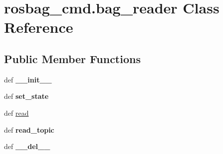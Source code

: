 \hypertarget{classrosbag__cmd_1_1bag__reader}{\section{rosbag\-\_\-cmd.\-bag\-\_\-reader Class Reference}
\label{classrosbag__cmd_1_1bag__reader}
}
\subsection*{Public Member Functions}
\begin{DoxyCompactItemize}
\item 
\hypertarget{classrosbag__cmd_1_1bag__reader_a1c340cf925f8d088902078782895c847}{def {\bfseries \-\_\-\-\_\-init\-\_\-\-\_\-}}\label{classrosbag__cmd_1_1bag__reader_a1c340cf925f8d088902078782895c847}

\item 
\hypertarget{classrosbag__cmd_1_1bag__reader_a292a0b9170ae69b7faca88b8d8ab6a84}{def {\bfseries set\-\_\-state}}\label{classrosbag__cmd_1_1bag__reader_a292a0b9170ae69b7faca88b8d8ab6a84}

\item 
def \hyperlink{classrosbag__cmd_1_1bag__reader_a14cd3d2f76745cceab0751b9eab9e3b4}{read}
\item 
\hypertarget{classrosbag__cmd_1_1bag__reader_a08166b9d3b9dad0f3e06e3a9f75f4c73}{def {\bfseries read\-\_\-topic}}\label{classrosbag__cmd_1_1bag__reader_a08166b9d3b9dad0f3e06e3a9f75f4c73}

\item 
\hypertarget{classrosbag__cmd_1_1bag__reader_a88a228e965fd5fd8122663c20cdf1580}{def {\bfseries \-\_\-\-\_\-del\-\_\-\-\_\-}}\label{classrosbag__cmd_1_1bag__reader_a88a228e965fd5fd8122663c20cdf1580}

\end{DoxyCompactItemize}
